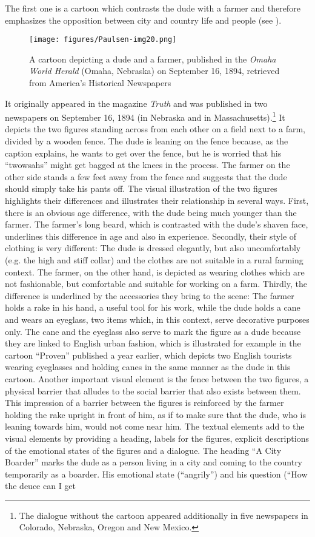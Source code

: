 The first one is a cartoon which contrasts the dude with a farmer and therefore emphasizes the opposition between city and country life and people (see ).
\begin{figure}
\texttt{[image: figures/Paulsen-img20.png]}
\caption{
A cartoon depicting a dude and a farmer, published in the \emph{Omaha World Herald} (Omaha, Nebraska) on September 16, 1894, retrieved from America's Historical Newspapers
}
\label{fig:key:20}
\end{figure}
It originally appeared in the magazine \emph{Truth} and was published in two newspapers on September 16, 1894 (in Nebraska and in Massachusetts).\footnote{The dialogue without the cartoon appeared additionally in five newspapers in Colorado, Nebraska, Oregon and New Mexico.} It depicts the two figures standing across from each other on a field next to a farm, divided by a wooden fence. The dude is leaning on the fence because, as the caption explains, he wants to get over the fence, but he is worried that his “twowsahs” might get bagged at the knees in the process. The farmer on the other side stands a few feet away from the fence and suggests that the dude should simply take his pants off. The visual illustration of the two figures highlights their differences and illustrates their relationship in several ways. First, there is an obvious age difference, with the dude being much younger than the farmer. The farmer’s long beard, which is contrasted with the dude’s shaven face, underlines this difference in age and also in experience. Secondly, their style of clothing is very different: The dude is dressed elegantly, but also uncomfortably (e.g. the high and stiff collar) and the clothes are not suitable in a rural farming context. The farmer, on the other hand, is depicted as wearing clothes which are not fashionable, but comfortable and suitable for working on a farm. Thirdly, the difference is underlined by the accessories they bring to the scene: The farmer holds a rake in his hand, a useful tool for his work, while the dude holds a cane and wears an eyeglass, two items which, in this context, serve decorative purposes only. The cane and the eyeglass also serve to mark the figure as a dude because they are linked to English urban fashion, which is illustrated for example in the cartoon “Proven” published a year earlier, which depicts two English tourists wearing eyeglasses and holding canes in the same manner as the dude in this cartoon. Another important visual element is the fence between the two figures, a physical barrier that alludes to the social barrier that also exists between them. This impression of a barrier between the figures is reinforced by the farmer holding the rake upright in front of him, as if to make sure that the dude, who is leaning towards him, would not come near him. The textual elements add to the visual elements by providing a heading, labels for the figures, explicit descriptions of the emotional states of the figures and a dialogue. The heading “A City Boarder” marks the dude as a person living in a city and coming to the country temporarily as a boarder. His emotional state (“angrily”) and his question (“How the deuce can I get 